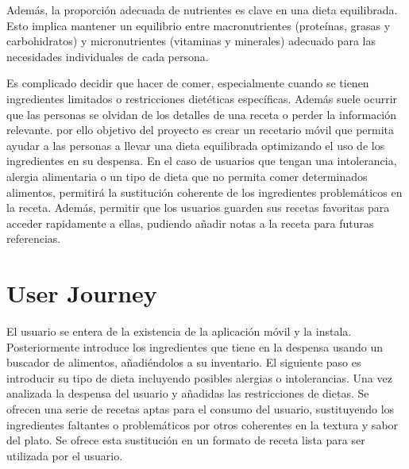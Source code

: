 Además, la proporción adecuada de nutrientes es clave en una dieta equilibrada. Esto implica mantener un equilibrio entre macronutrientes (proteínas, grasas y carbohidratos) y micronutrientes (vitaminas y minerales) adecuado para las necesidades individuales de cada persona.

Es complicado decidir que hacer de comer, especialmente cuando se tienen ingredientes limitados o restricciones dietéticas específicas. Además suele ocurrir que las personas se olvidan de los detalles de una receta o perder la información relevante. por ello objetivo del proyecto es crear un recetario móvil que permita ayudar a las personas a llevar una dieta equilibrada optimizando el uso de los ingredientes en su despensa. En el caso de usuarios que tengan una intolerancia, alergia alimentaria o un tipo de dieta que no permita comer determinados alimentos, permitirá la sustitución coherente de los ingredientes problemáticos en la receta. Además, permitir que los usuarios guarden sus recetas favoritas para acceder rapidamente a ellas, pudiendo añadir notas a la receta para futuras referencias.

\section{User Journey}
El usuario se entera de la existencia de la aplicación móvil y la instala. Posteriormente introduce los ingredientes que tiene en la despensa usando un buscador de alimentos, añadiéndolos a su inventario. El siguiente paso es introducir su tipo de dieta incluyendo posibles alergias o intolerancias. Una vez analizada la despensa del usuario y añadidas las restricciones de dietas. Se ofrecen una serie de recetas aptas para el consumo del usuario, sustituyendo los ingredientes faltantes o problemáticos por otros coherentes en la textura y sabor del plato. Se ofrece esta sustitución en un formato de receta lista para ser utilizada por el usuario.

